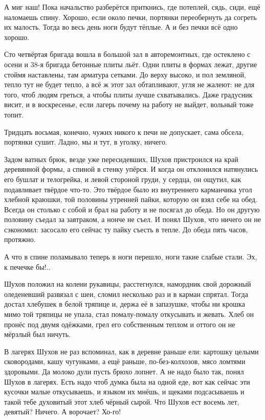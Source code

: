 А миг \dash наш! Пока начальство разберётся \dash приткнись, где потеплей, сядь, сиди, ещё наломаешь
спину. Хорошо, если около печки, \dash портянки переобернуть да согреть их малость. Тогда во весь
день ноги будут тёплые. А и без печки \dash всё одно хорошо.

Сто четвёртая бригада вошла в большой зал в авторемонтных, где остеклено с осени и 38-я
бригада бетонные плиты льёт. Одни плиты в формах лежат, другие стоймя наставлены, там
арматура сетками. До верху высоко, и пол земляной, тепло тут не будет тепло, а всё ж этот зал
обтапливают, угля не жалеют: не для того, чтоб людям греться, а чтобы плиты лучше
схватывались. Даже градусник висит, и в воскресенье, если лагерь почему на работу не выйдет,
вольный тоже топит.

Тридцать восьмая, конечно, чужих никого к печи не допускает, сама обсела, портянки сушит.
Ладно, мы и тут, в уголку, ничего.

Задом ватных брюк, везде уже пересидевших, Шухов пристроился на край деревянной формы, а
спиной в стенку упёрся. И когда он отклонился \dash натянулись его бушлат и телогрейка, и левой
стороной груди, у сердца, он ощутил, как подавливает твёрдое что-то. Это твёрдое было \dash из
внутреннего карманчика угол хлебной краюшки, той половины утренней пайки, которую он взял
себе на обед. Всегда он столько с собой и брал на работу и не посягал до обеда. Но он другую
половину съедал за завтраком, а нонче не съел. И понял Шухов, что ничего он не сэкономил:
засосало его сейчас ту пайку съесть в тепле. До обеда \dash пять часов, протяжно.

А что в спине поламывало \dash теперь в ноги перешло, ноги такие слабые стали. Эх, к печечке бы!..

Шухов положил на колени рукавицы, расстегнулся, намордник свой дорожный оледеневший
развязал с шеи, сломил несколько раз и в карман спрятал. Тогда достал хлебушек в белой
тряпице и, держа её в запазушке, чтобы ни крошка мимо той тряпицы не упала, стал помалу-помалу
откусывать и жевать. Хлеб он пронёс под двумя одёжками, грел его собственным теплом \dash и
оттого он не мёрзлый был ничуть.

В лагерях Шухов не раз вспоминал, как в деревне раньше ели: картошку \dash целыми сковородами,
кашу \dash чугунками, а ещё раньше, по-без-колхозов, мясо \dash ломтями здоровыми. Да молоко дули \dash
пусть брюхо лопнет. А не надо было так, понял Шухов в лагерях. Есть надо \dash чтоб думка была на
одной еде, вот как сейчас эти кусочки малые откусываешь, и языком их мнёшь, и щеками
подсасываешь \dash и такой тебе духовитый этот хлеб чёрный сырой. Что Шухов ест восемь лет,
девятый? Ничего. А ворочает? Хо-го!

